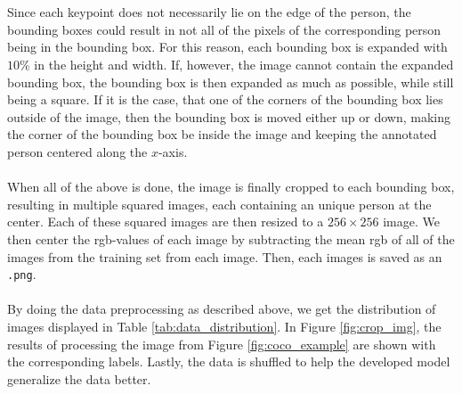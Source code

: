 \documentclass[./main.tex]{subfiles}
\begin{document}
\\
\\
Since each keypoint does not necessarily lie on the edge of the person, the bounding boxes could result in not all of the pixels of the corresponding person being in the bounding box. For this reason, each bounding box is expanded with $10\%$ in the height and width. If, however, the image cannot contain the expanded bounding box, the bounding box is then expanded as much as possible, while still being a square. If it is the case, that one of the corners of the bounding box lies outside of the image, then the bounding box is moved either up or down, making the corner of the bounding box be inside the image and keeping the annotated person centered along the $x$-axis. 
\\
\\
When all of the above is done, the image is finally cropped to each bounding box, resulting in multiple squared images, each containing an unique person at the center. Each of these squared images are then resized to a $256 \times 256$ image. We then center the rgb-values of each image by subtracting the mean rgb of all of the images from the training set from each image. Then, each images is saved as an \texttt{.png}.
\\
\\
By doing the data preprocessing as described above, we get the distribution of images displayed in Table \ref{tab:data_distribution}. In Figure \ref{fig:crop_img}, the results of processing the image from Figure \ref{fig:coco_example} are shown with the corresponding labels. Lastly, the data is shuffled to help the developed model generalize the data better.
\end{document}

